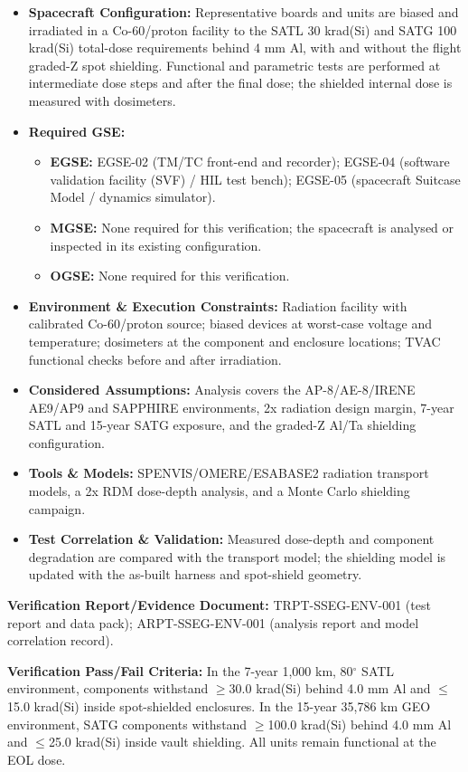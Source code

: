 \begin{itemize}
\item \textbf{Spacecraft Configuration:} Representative boards and units are biased and irradiated in a Co-60/proton facility to the SATL 30 krad(Si) and SATG 100 krad(Si) total-dose requirements behind 4 mm Al, with and without the flight graded-Z spot shielding. Functional and parametric tests are performed at intermediate dose steps and after the final dose; the shielded internal dose is measured with dosimeters.
\item \textbf{Required GSE:}
\begin{itemize}
\item \textbf{EGSE:} EGSE-02 (TM/TC front-end and recorder); EGSE-04 (software validation facility (SVF) / HIL test bench); EGSE-05 (spacecraft Suitcase Model / dynamics simulator).
\item \textbf{MGSE:} None required for this verification; the spacecraft is analysed or inspected in its existing configuration.
\item \textbf{OGSE:} None required for this verification.
\end{itemize}
\item \textbf{Environment \& Execution Constraints:} Radiation facility with calibrated Co-60/proton source; biased devices at worst-case voltage and temperature; dosimeters at the component and enclosure locations; TVAC functional checks before and after irradiation.
\item \textbf{Considered Assumptions:} Analysis covers the AP-8/AE-8/IRENE AE9/AP9 and SAPPHIRE environments, 2x radiation design margin, 7-year SATL and 15-year SATG exposure, and the graded-Z Al/Ta shielding configuration.
\item \textbf{Tools \& Models:} SPENVIS/OMERE/ESABASE2 radiation transport models, a 2x RDM dose-depth analysis, and a Monte Carlo shielding campaign.
\item \textbf{Test Correlation \& Validation:} Measured dose-depth and component degradation are compared with the transport model; the shielding model is updated with the as-built harness and spot-shield geometry.
\end{itemize}
\par\textbf{Verification Report/Evidence Document:} TRPT-SSEG-ENV-001 (test report and data pack); ARPT-SSEG-ENV-001 (analysis report and model correlation record).
\par\textbf{Verification Pass/Fail Criteria:} In the 7-year 1,000 km, 80$^\circ$ SATL environment, components withstand $\ge$30.0 krad(Si) behind 4.0 mm Al and $\le$15.0 krad(Si) inside spot-shielded enclosures. In the 15-year 35,786 km GEO environment, SATG components withstand $\ge$100.0 krad(Si) behind 4.0 mm Al and $\le$25.0 krad(Si) inside vault shielding. All units remain functional at the EOL dose.
\par\medskip
